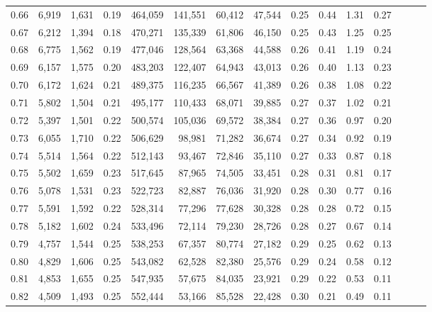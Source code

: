 \begin{tabular}{rrrrrrrrrrrrrrr}
0.66 &   6,919 &  1,631 &  0.19 &  464,059 &  141,551 &   60,412 &   47,544 &  0.25 &  0.44 &  1.31 &      0.27 \\
0.67 &   6,212 &  1,394 &  0.18 &  470,271 &  135,339 &   61,806 &   46,150 &  0.25 &  0.43 &  1.25 &      0.25 \\
0.68 &   6,775 &  1,562 &  0.19 &  477,046 &  128,564 &   63,368 &   44,588 &  0.26 &  0.41 &  1.19 &      0.24 \\
0.69 &   6,157 &  1,575 &  0.20 &  483,203 &  122,407 &   64,943 &   43,013 &  0.26 &  0.40 &  1.13 &      0.23 \\
0.70 &   6,172 &  1,624 &  0.21 &  489,375 &  116,235 &   66,567 &   41,389 &  0.26 &  0.38 &  1.08 &      0.22 \\
0.71 &   5,802 &  1,504 &  0.21 &  495,177 &  110,433 &   68,071 &   39,885 &  0.27 &  0.37 &  1.02 &      0.21 \\
0.72 &   5,397 &  1,501 &  0.22 &  500,574 &  105,036 &   69,572 &   38,384 &  0.27 &  0.36 &  0.97 &      0.20 \\
0.73 &   6,055 &  1,710 &  0.22 &  506,629 &   98,981 &   71,282 &   36,674 &  0.27 &  0.34 &  0.92 &      0.19 \\
0.74 &   5,514 &  1,564 &  0.22 &  512,143 &   93,467 &   72,846 &   35,110 &  0.27 &  0.33 &  0.87 &      0.18 \\
0.75 &   5,502 &  1,659 &  0.23 &  517,645 &   87,965 &   74,505 &   33,451 &  0.28 &  0.31 &  0.81 &      0.17 \\
0.76 &   5,078 &  1,531 &  0.23 &  522,723 &   82,887 &   76,036 &   31,920 &  0.28 &  0.30 &  0.77 &      0.16 \\
0.77 &   5,591 &  1,592 &  0.22 &  528,314 &   77,296 &   77,628 &   30,328 &  0.28 &  0.28 &  0.72 &      0.15 \\
0.78 &   5,182 &  1,602 &  0.24 &  533,496 &   72,114 &   79,230 &   28,726 &  0.28 &  0.27 &  0.67 &      0.14 \\
0.79 &   4,757 &  1,544 &  0.25 &  538,253 &   67,357 &   80,774 &   27,182 &  0.29 &  0.25 &  0.62 &      0.13 \\
0.80 &   4,829 &  1,606 &  0.25 &  543,082 &   62,528 &   82,380 &   25,576 &  0.29 &  0.24 &  0.58 &      0.12 \\
0.81 &   4,853 &  1,655 &  0.25 &  547,935 &   57,675 &   84,035 &   23,921 &  0.29 &  0.22 &  0.53 &      0.11 \\
0.82 &   4,509 &  1,493 &  0.25 &  552,444 &   53,166 &   85,528 &   22,428 &  0.30 &  0.21 &  0.49 &      0.11 \\

\end{tabular}
